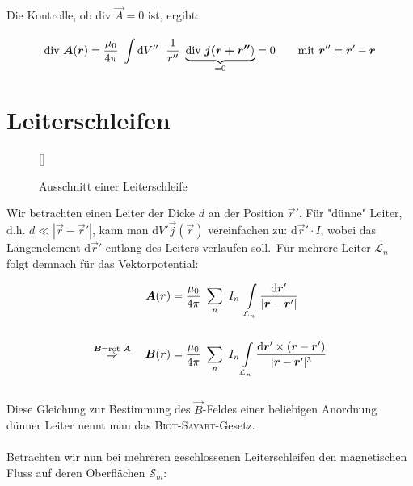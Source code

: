 Die Kontrolle, ob div $\vec{A} =0$ ist, ergibt:

\begin{equation*}
\div\vec{A}(\vec{r}) = \frac{\mu_0}{4\pi} \ \Int{}{}{V''}\ \frac{1}{r''} \ \underbrace{\div\vec{j(\vec{r}+\vec{r}''})}_{=0}=0 \qquad \text{mit } \vec{r}'' = \vec{r}'-\vec{r}
\end{equation*}

\section{Leiterschleifen}

\begin{wrapfigure}[]{l}[0cm]{0cm}
	\raisebox{0pt}[\dimexpr{}\baselineskip\relax]{
		\colorbox{hgrey}{
		}
	}
	\caption{Ausschnitt einer Leiterschleife}
\end{wrapfigure}
Wir betrachten einen Leiter der Dicke $d$ an der Position $\vec{r}'$. Für "dünne" Leiter, d.h. $d \ll |\vec{r}-\vec{r}'|$, kann man d$V' \vec{j}(\vec{r})$ vereinfachen zu: d$\vec{r}' \cdot I$, wobei das Längenelement d$\vec{r}'$ entlang des Leiters verlaufen soll.\
Für mehrere Leiter $\mathcal{L}_n$ folgt demnach für das Vektorpotential:

\begin{align*}
\vec{A}(\vec{r}) &= \frac{\mu_0}{4\pi}\ \sum_n \ I_n \ \int\limits_{\mathcal{L}_n} \frac{\mathrm{d}\vec{r}'}{|\vec{r}-\vec{r}'|}\\
\ \\
\overset{\vec{B}= \rot\vec{A}}{\Rightarrow} \quad \vec{B}(\vec{r}) &= \frac{\mu_0}{4\pi} \ \sum_n \ I_n \int\limits_{\mathcal{L}_n} \frac{\mathrm{d}\vec{r}' \times (\vec{r}-\vec{r}')}{|\vec{r}-\vec{r}'|^3}
\end{align*}
\ \\
Diese Gleichung zur Bestimmung des $\vec{B}$-Feldes einer beliebigen Anordnung dünner Leiter nennt man das \textsc{Biot-Savart}-Gesetz.\
\\
\ \\
Betrachten wir nun bei mehreren geschlossenen Leiterschleifen den magnetischen Fluss auf deren Oberflächen $\mathcal{S}_m$:

